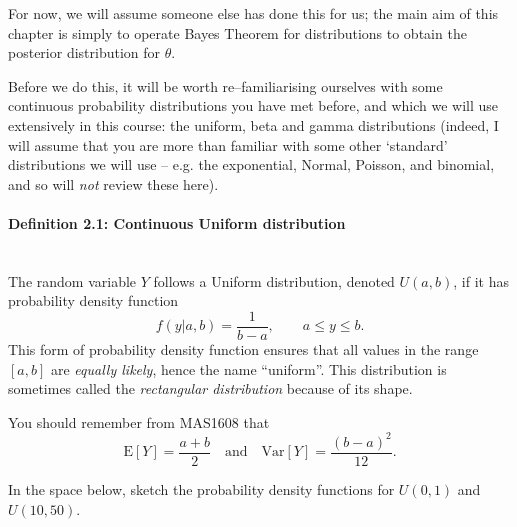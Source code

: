 For now, we will assume someone else has done this for us; the main aim of this chapter is simply to operate Bayes Theorem for distributions to obtain the posterior distribution for $\theta$.  

Before we do this, it will be worth re--familiarising ourselves with some continuous probability distributions you have met before, and which we will use extensively in this course: the uniform, beta and gamma distributions (indeed, I will assume that you are more than familiar with some other `standard' distributions we will use -- e.g. the exponential, Normal, Poisson, and binomial, and so will \textit{not} review these here).  

\paragraph{Definition 2.1: Continuous Uniform distribution}{~\\
The random variable $Y$ follows a Uniform distribution, denoted $U(a,b)$, if it has probability density function
$$
f(y|a,b) = \frac{1}{b-a}, \quad \quad a\leq y \leq b.
$$
This form of probability density function ensures that all values in the range $[a,b]$ are \textit{equally likely}, hence the name ``uniform''.  This distribution is sometimes called the \textit{rectangular distribution} because of its shape.  

You should remember from MAS1608 that 
$$
\text{E}[Y] = \frac{a+b}{2} \quad \mathrm{and} \quad \text{Var}[Y] = \frac{(b-a)^{2}}{12}.
$$}
In the space below, sketch the probability density functions for $U(0,1)$ and $U(10,50)$. 

\begin{gapbox}
    
\end{gapbox}

